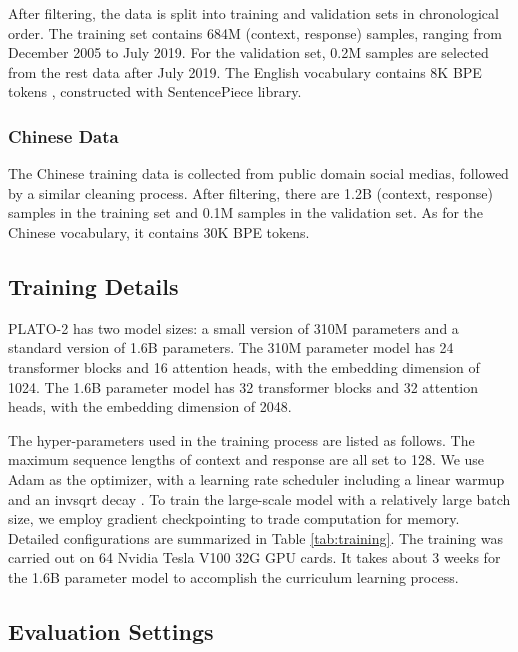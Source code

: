 \documentclass[11pt,a4paper]{article}
\begin{document}
	After filtering, the data is split into training and validation sets in chronological order. The training set contains 684M (context, response) samples, ranging from December 2005 to July 2019. For the validation set, 0.2M samples are selected from the rest data after July 2019. The English vocabulary contains 8K BPE tokens \cite{sennrich2016neural}, constructed with SentencePiece library.
	
	\subsubsection{Chinese Data}
	The Chinese training data is collected from public domain social medias, followed by a similar cleaning process. After filtering, there are 1.2B (context, response) samples in the training set and 0.1M samples in the validation set. As for the Chinese vocabulary, it contains 30K BPE tokens.
	
	\subsection{Training Details}
	PLATO-2 has two model sizes: a small version of 310M parameters and a standard version of 1.6B parameters. The 310M parameter model has 24 transformer blocks and 16 attention heads, with the embedding dimension of 1024. The 1.6B parameter model has 32 transformer blocks and 32 attention heads, with the embedding dimension of 2048. 
	
	The hyper-parameters used in the training process are listed as follows. The maximum sequence lengths of context and response are all set to 128. We use Adam \cite{kingma2015adam} as the optimizer, with a learning rate scheduler including a linear warmup and an invsqrt decay \cite{vaswani2017attention}. To train the large-scale model with a relatively large batch size, we employ gradient checkpointing \cite{chen2016training} to trade computation for memory. Detailed configurations are summarized in Table \ref{tab:training}. The training was carried out on 64 Nvidia Tesla V100 32G GPU cards. It takes about 3 weeks for the 1.6B parameter model to accomplish the curriculum learning process.
	
	\subsection{Evaluation Settings}
\end{document}
